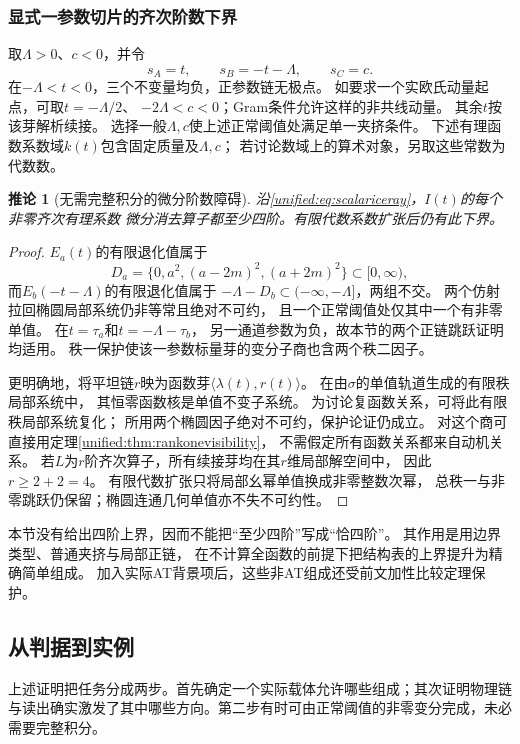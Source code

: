 \documentclass[11pt,a4paper,oneside]{ctexart}
\theoremstyle{cnplain}
\newtheorem{corollary}[theorem]{推论}
\theoremstyle{definition}
\theoremstyle{remark}
\numberwithin{equation}{section}
\begin{document}
\subsubsection{显式一参数切片的齐次阶数下界}
取$\Lambda>0$、$c<0$，并令
\begin{equation}\label{unified:eq:scalariceray}
 s_A=t,\qquad s_B=-t-\Lambda,\qquad s_C=c.
\end{equation}
在$-\Lambda<t<0$，三个不变量均负，正参数链无极点。
如要求一个实欧氏动量起点，可取$t=-\Lambda/2$、
$-2\Lambda<c<0$；Gram条件允许这样的非共线动量。
其余$t$按该芽解析续接。
选择一般$\Lambda,c$使上述正常阈值处满足单一夹挤条件。
下述有理函数系数域$k(t)$包含固定质量及$\Lambda,c$；
若讨论数域上的算术对象，另取这些常数为代数数。

\begin{corollary}[无需完整积分的微分阶数障碍]\label{unified:cor:scalariceorder}
沿\eqref{unified:eq:scalariceray}，$I(t)$的每个非零齐次有理系数
微分消去算子都至少四阶。有限代数系数扩张后仍有此下界。
\end{corollary}
\begin{proof}
$E_a(t)$的有限退化值属于
\[
 D_a=\{0,a^2,(a-2m)^2,(a+2m)^2\}\subset[0,\infty),
\]
而$E_b(-t-\Lambda)$的有限退化值属于
$-\Lambda-D_b\subset(-\infty,-\Lambda]$，两组不交。
两个仿射拉回椭圆局部系统仍非等常且绝对不可约，
且一个正常阈值处仅其中一个有非零单值。
在$t=\tau_a$和$t=-\Lambda-\tau_b$，
另一通道参数为负，故本节的两个正链跳跃证明均适用。
秩一保护使该一参数标量芽的变分子商也含两个秩二因子。

更明确地，将平坦链$r$映为函数芽$\langle\lambda(t),r(t)\rangle$。
在由$\sigma$的单值轨道生成的有限秩局部系统中，
其恒零函数核是单值不变子系统。
为讨论复函数关系，可将此有限秩局部系统复化；
所用两个椭圆因子绝对不可约，保护论证仍成立。
对这个商可直接用定理\ref{unified:thm:rankonevisibility}，
不需假定所有函数关系都来自动机关系。
若$L$为$r$阶齐次算子，所有续接芽均在其$r$维局部解空间中，
因此$r\geq2+2=4$。
有限代数扩张只将局部幺幂单值换成非零整数次幂，
总秩一与非零跳跃仍保留；椭圆连通几何单值亦不失不可约性。
\end{proof}

本节没有给出四阶上界，因而不能把“至少四阶”写成“恰四阶”。
其作用是用边界类型、普通夹挤与局部正链，
在不计算全函数的前提下把结构表的上界提升为精确简单组成。
加入实际AT背景项后，这些非AT组成还受前文加性比较定理保护。



\endgroup
\subsection{从判据到实例}
上述证明把任务分成两步。首先确定一个实际载体允许哪些组成；其次证明物理链与读出确实激发了其中哪些方向。第二步有时可由正常阈值的非零变分完成，未必需要完整积分。
\end{document}
